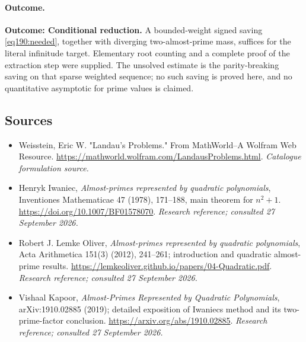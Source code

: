 \documentclass[11pt,a4paper]{article}
\numberwithin{equation}{section}
\begin{document}
\paragraph{Outcome.}
\textbf{Outcome: Conditional reduction.}
A bounded-weight signed saving \eqref{eq190:needed}, together with diverging two-almost-prime mass, suffices for the literal infinitude target. Elementary root counting and a complete proof of the extraction step were supplied. The unsolved estimate is the parity-breaking saving on that sparse weighted sequence; no such saving is proved here, and no quantitative asymptotic for prime values is claimed.

\subsection{Sources}
\begin{itemize}\raggedright
\item[\textnormal{[S1]}]\hypertarget{source:190:1}{} Weisstein, Eric W. "Landau's Problems." From MathWorld--A Wolfram Web Resource.
\url{https://mathworld.wolfram.com/LandausProblems.html}.
{\small\textit{Catalogue formulation source.}}
\item[\textnormal{[E1]}]\hypertarget{extra:190:1}{} Henryk Iwaniec, \emph{Almost-primes represented by quadratic polynomials}, Inventiones Mathematicae 47 (1978), 171--188, main theorem for $n^2+1$.
\url{https://doi.org/10.1007/BF01578070}.
{\small\textit{Research reference; consulted 27 September 2026.}}
\item[\textnormal{[E2]}]\hypertarget{extra:190:2}{} Robert J. Lemke Oliver, \emph{Almost-primes represented by quadratic polynomials}, Acta Arithmetica 151(3) (2012), 241--261; introduction and quadratic almost-prime results.
\url{https://lemkeoliver.github.io/papers/04-Quadratic.pdf}.
{\small\textit{Research reference; consulted 27 September 2026.}}
\item[\textnormal{[E3]}]\hypertarget{extra:190:3}{} Vishaal Kapoor, \emph{Almost-Primes Represented by Quadratic Polynomials}, arXiv:1910.02885 (2019); detailed exposition of Iwaniec\textquotesingle s method and its two-prime-factor conclusion.
\url{https://arxiv.org/abs/1910.02885}.
{\small\textit{Research reference; consulted 27 September 2026.}}
\end{itemize}
\end{document}
